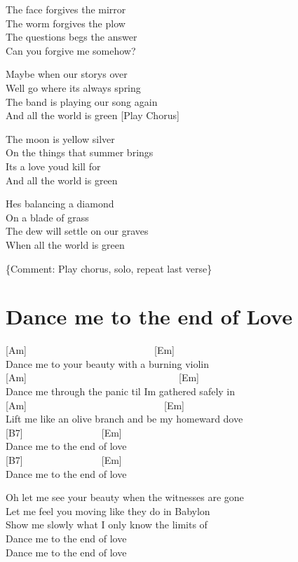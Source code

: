 \documentclass[
  letterpaper,
]{scrbook}
\begin{document}
The face forgives the mirror\\
The worm forgives the plow\\
The questions begs the answer\\
Can you forgive me somehow?

Maybe when our story\textquotesingle s over\\
We\textquotesingle ll go where it\textquotesingle s always spring\\
The band is playing our song again\\
And all the world is green {[}Play Chorus{]}

The moon is yellow silver\\
On the things that summer brings\\
It\textquotesingle s a love you\textquotesingle d kill for\\
And all the world is green

He\textquotesingle s balancing a diamond\\
On a blade of grass\\
The dew will settle on our graves\\
When all the world is green

\{Comment: Play chorus, solo, repeat last verse\}

\hypertarget{dance-me-to-the-end-of-love}{%
\chapter{Dance me to the end of
Love}\label{dance-me-to-the-end-of-love}}

{[}Am{]}~~~~~~~~~~~~~~~~~~~~~~~~~~{[}Em{]}\\
Dance me to your beauty with a burning violin\\
{[}Am{]}~~~~~~~~~~~~~~~~~~~~~~~~~~~~~~~{[}Em{]}\\
Dance me through the panic \textquotesingle til I\textquotesingle m
gathered safely in\\
{[}Am{]}~~~~~~~~~~~~~~~~~~~~~~~~~~~~{[}Em{]}\\
Lift me like an olive branch and be my homeward dove\\
{[}B7{]}~~~~~~~~~~~~~~~~{[}Em{]}\\
Dance me to the end of love\\
{[}B7{]}~~~~~~~~~~~~~~~~{[}Em{]}\\
Dance me to the end of love

Oh let me see your beauty when the witnesses are gone\\
Let me feel you moving like they do in Babylon\\
Show me slowly what I only know the limits of\\
Dance me to the end of love\\
Dance me to the end of love
\end{document}
